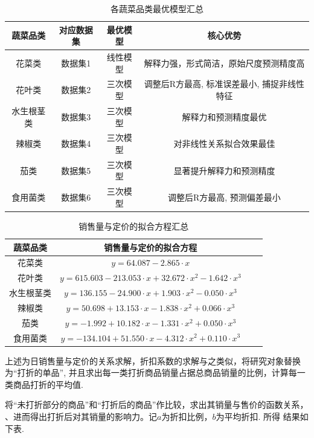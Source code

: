 \documentclass{cumcmthesis}
\begin{document}
\begin{table}[H]
\centering
\begin{tabular}{cccc}
\hline
蔬菜品类 & 对应数据集 & 最优模型 & 核心优势 \\
\hline
花菜类 & 数据集1 & 线性模型 & 解释力强，形式简洁，原始尺度预测精度高 \\
花叶类 & 数据集2 & 三次模型 & 调整后R方最高, 标准误差最小, 捕捉非线性特征 \\
水生根茎类 & 数据集3 & 三次模型 & 解释力和预测精度最优 \\
辣椒类 & 数据集4 & 三次模型 & 对非线性关系拟合效果最佳 \\
茄类 & 数据集5 & 三次模型 & 显著提升解释力和预测精度 \\
食用菌类 & 数据集6 & 三次模型 & 调整后R方最高, 预测偏差最小 \\
\hline
\end{tabular}
\caption{各蔬菜品类最优模型汇总}
\label{tab:best_models}
\end{table}

\begin{table}[H]
\centering
\begin{tabular}{cccc}
\hline
蔬菜品类 & \qquad 销售量与定价的拟合方程 \\
\hline
花菜类 &  \qquad $y=64.087-2.865\cdot x$ \\
花叶类 &   \qquad  $y=615.603-213.053 \cdot x+32.672 \cdot x^2 -1.642 \cdot x^3 $ \\
水生根茎类 &  \qquad $y=136.155 −24.900 \cdot x + 1.903 \cdot x^2−0.050 \cdot x^3$ \\
辣椒类 & \qquad  $ y=50.698+13.153 \cdot x−1.838\cdot  x^2 +0.066 \cdot x^3 $\\
茄类 &  \qquad   $y = −1.992+10.182 \cdot x−1.331 \cdot x^2+0.050 \cdot x^3 $ \\
食用菌类 & \qquad   $y=-134.104+51.550 \cdot x− 4.312 \cdot x^2+0.110 \cdot x^3$ \\
\hline
\end{tabular}
\caption{销售量与定价的拟合方程汇总}
\label{tab:best_models}
\end{table}

上述为日销售量与定价的关系求解，折扣系数的求解与之类似，将研究对象替换为“打折的单品”, 
并且求出每一类打折商品销量占据总商品销量的比例，计算每一类商品打折的平均值. 

将“未打折部分的商品”和“打折后的商品”作比较，求出其销量与售价的函数关系，
、进而得出打折后对其销量的影响力。记$a$为折扣比例，$b$为平均折扣. 所得
结果如下表.
\end{document}
